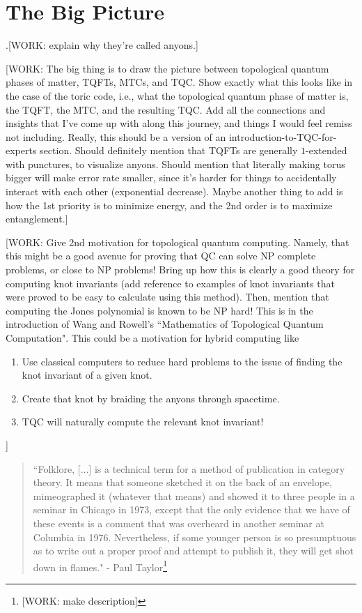 \documentclass{article}
\theoremstyle{definition}
\numberwithin{figure}{section}
\begin{document}
\section{The Big Picture}
\label{The Big Picture}

.[WORK: explain why they're called anyons.]

[WORK: The big thing is to draw the picture between topological quantum phases of matter, TQFTs, MTCs, and TQC. Show exactly what this looks like in the case of the toric code, i.e., what the topological quantum phase of matter is, the TQFT, the MTC, and the resulting TQC. Add all the connections and insights that I've come up with along this journey, and things I would feel remiss not including. Really, this should be a version of an introduction-to-TQC-for-experts section. Should definitely mention that TQFTs are generally $1$-extended with punctures, to visualize anyons. Should mention that literally making torus bigger will make error rate smaller, since it's harder for things to accidentally interact with each other (exponential decrease). Maybe another thing to add is how the 1st priority is to minimize energy, and the 2nd order is to maximize entanglement.]

[WORK: Give 2nd motivation for topological quantum computing. Namely, that this might be a good avenue for proving that QC can solve NP complete problems, or close to NP problems! Bring up how this is clearly a good theory for computing knot invariants (add reference to examples of knot invariants that were proved to be easy to calculate using this method). Then, mention that computing the Jones polynomial is known to be NP hard! This is in the introduction of Wang and Rowell's ``Mathematics of Topological Quantum Computation". This could be a motivation for hybrid computing like

\begin{enumerate}
\item Use classical computers to reduce hard problems to the issue of finding the knot invariant of a given knot.
\item Create that knot by braiding the anyons through spacetime.
\item TQC will naturally compute the relevant knot invariant!
\end{enumerate}
]

\begin{quote}
``Folklore, [...] is a technical term for a method of publication in category theory. It means that someone sketched it on the back of an envelope, mimeographed it (whatever that means) and showed it to three people in a seminar in Chicago in 1973, except that the only evidence that we have of these events is a comment that was overheard in another seminar at Columbia in 1976. Nevertheless, if some younger person is so presumptuous as to write out a proper proof and attempt to publish it, they will get shot down in flames." - Paul Taylor\footnote{[WORK: make description]\cite{aubert2019categories}}
\end{quote}
\end{document}
